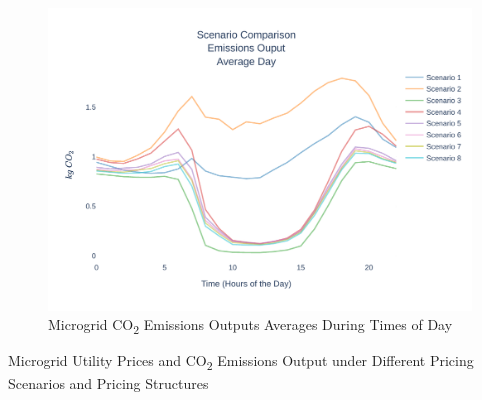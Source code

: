 \documentclass[conference]{IEEEtran}
\begin{document}
	\begin{figure}[H]
		\centering
		\includegraphics[width=1\linewidth]{Fig/emissions_scenario_comparison_run_3}
		\caption{Microgrid  CO\textsubscript{2} Emissions Outputs Averages During Times of Day}
		\label{fig:emissionsscenariocomparison}
	\end{figure}
	
	\begin{table}[H]
		\caption{Microgrid Utility Prices and CO\textsubscript{2} Emissions Output under Different Pricing Scenarios and Pricing Structures}
		\tiny
		\centering
		
		\normalsize
		\label{tab:emissions}
	\end{table}
	
\end{document}

